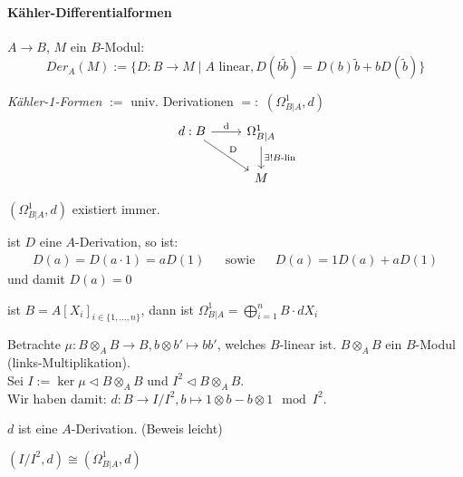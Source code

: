 \paragraph{Kähler-Differentialformen}
$A\rightarrow B$, $M$ ein $B$-Modul:
\[
Der_A(M):=\{
D:B\rightarrow M\mid A\text{ linear}, D(b\tilde b)=D(b)\tilde b + bD(\tilde b)
\}
\]
\begin{definition}
\emph{Kähler-1-Formen} $:=$ univ. Derivationen $=:$ $(\Omega_{B|A}^1,d)$
	\[\begin{tikzcd}
		d:B \rar{\text{d}} \arrow{dr}{\text{D}} & \Omega_{B\mid A}^1
    \dar{\exists! \text{$B$-lin}} \\
		                                                 & M
	\end{tikzcd}\]
\end{definition}
\begin{satz}
$(\Omega_{B|A}^1,d)$ existiert immer.
\end{satz}
\begin{bemerkung}
ist $D$ eine $A$-Derivation, so ist:
\begin{align*}
D(a)=D(a\cdot 1)=a D(1) && \text{sowie} && D(a)=1D(a)+aD(1)
\end{align*}
und damit $D(a)=0$
\end{bemerkung}
\begin{lemma}
ist $B=A[X_i]_{i\in\{1,\dots,n\}}$, dann ist
$\Omega_{B|A}^1=\bigoplus_{i=1}^nB\cdot dX_i$
\end{lemma}
Betrachte $\mu:B\otimes_A B\rightarrow B,b\otimes b'\mapsto bb'$, welches
$B$-linear ist. $B\otimes_A B$ ein $B$-Modul (links-Multiplikation).\\
Sei $I:=\ker\mu\vartriangleleft B\otimes_A B$ und $I^2\vartriangleleft
B\otimes_A B$.\\
Wir haben damit: $d:B\rightarrow I/I^2,b\mapsto 1\otimes b-b\otimes 1\mod I^2$.
\begin{bemerkung}
$d$ ist eine $A$-Derivation. (Beweis leicht)
\end{bemerkung}
\begin{satz}
$(I/I^2,d)\cong(\Omega_{B|A}^1,d)$
\end{satz}
